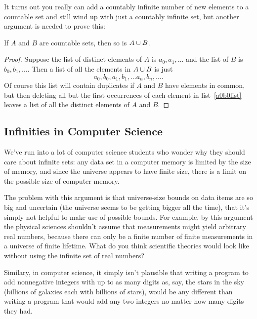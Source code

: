 It turns out you really can add a countably infinite number of new
elements to a countable set and still wind up with just a countably
infinite set, but another argument is needed to prove this:

\begin{lemma}\label{countable-union}
If $A$ and $B$ are countable sets, then so is $A \cup B$.
\end{lemma}

\begin{proof}
Suppose the list of distinct elements of $A$ is $a_0,a_1,\dots$ and the
list of $B$ is $b_0,b_1, \dots$.  Then a list of all the elements in $A
\cup B$ is just
\begin{equation}\label{a0b0list}
a_0,b_0,a_1,b_1, \dots a_n,b_n, \dots.
\end{equation}
Of course this list will contain duplicates if $A$ and $B$ have elements
in common, but then deleting all but the first occurrences of each element in
list~\eqref{a0b0list} leaves a list of all the distinct elements of $A$
and $B$.
\end{proof}

\subsection{Infinities in Computer Science}

We've run into a lot of computer science students who wonder why they
should care about infinite sets: any data set in a computer memory is
limited by the size of memory, and since the universe appears to have
finite size, there is a limit on the possible size of computer memory.

\iffalse need to learn all this abstract theory of infinite sets, and this
is a good question.  \fi

The problem with this argument is that universe-size bounds on data
items are so big and uncertain (the universe seems to be getting
bigger all the time), that it's simply not helpful to make use of
possible bounds.  For example, by this argument the physical sciences
shouldn't assume that measurements might yield arbitrary real numbers,
because there can only be a finite number of finite measurements in a
universe of finite lifetime.  What do you think scientific theories
would look like without using the infinite set of real numbers?

Similary, in computer science, it simply isn't plausible that writing a
program to add nonnegative integers with up to as many digits as, say, the
stars in the sky (billions of galaxies each with billions of stars), would
be any different than writing a program that would add any two integers
no matter how many digits they had.

